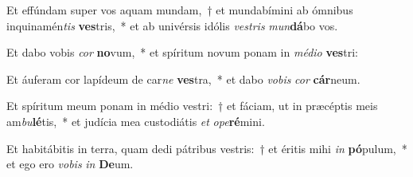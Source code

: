 \item Et effúndam super vos aquam mundam,~† et mundabímini ab ómnibus inquinamén\textit{tis} \textbf{ves}tris,~* et ab univérsis idólis \textit{ves}\textit{tris} \textit{mun}\textbf{dá}bo vos.
\item Et dabo vobis \textit{cor} \textbf{no}vum,~* et spíritum novum ponam in \textit{mé}\textit{di}\textit{o} \textbf{ves}tri:
\item Et áuferam cor lapídeum de car\textit{ne} \textbf{ves}tra,~* et dabo \textit{vo}\textit{bis} \textit{cor} \textbf{cár}neum.
\item Et spíritum meum ponam in médio vestri:~† et fáciam, ut in præcéptis meis am\textit{bu}\textbf{lé}tis,~* et judícia mea custodiátis \textit{et} \textit{o}\textit{pe}\textbf{ré}mini.
\item Et habitábitis in terra, quam dedi pátribus vestris:~† et éritis mihi \textit{in} \textbf{pó}pulum,~* et ego ero \textit{vo}\textit{bis} \textit{in} \textbf{De}um.
